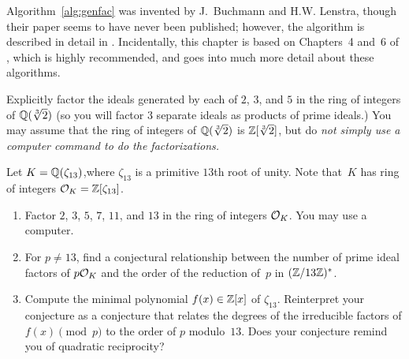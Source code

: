 Algorithm~\ref{alg:genfac} was invented by J.~Buchmann and
H.\thinspace{}W. Lenstra, though their paper seems to have never been
published; however, the algorithm is described in detail in
\cite[\S6.2.5]{cohen:course_ant}.  Incidentally, this chapter is based
on Chapters~4 and~6 of \cite{cohen:course_ant}, which is highly
recommended, and goes into much more detail about these algorithms.


\begin{exercise}
	Explicitly factor the ideals generated by each of $2$, $3$, and $5$ in
	the ring of integers of $\mathbb{Q}(\sqrt[3]{2})$ (so you will factor $3$
	separate ideals as products of prime ideals.)
	You may assume that the ring of integers of $\mathbb{Q}(\sqrt[3]{2})$
	is $\mathbb{Z}[\sqrt[3]{2}]$, but do \em{not} simply use a computer command to do
	the factorizations.
\end{exercise}

\begin{exercise}
	Let $K=\mathbb{Q}(\zeta_{13})$,where $\zeta_{13}$ is a primitive $13$th root of
	unity. Note that~$K$ has ring of integers $\mathcal{O}_K=\mathbb{Z}[\zeta_{13}]$.
	\begin{enumerate}
		\item Factor $2$, $3$, $5$, $7$, $11$, and $13$ in the ring
		of integers $\mathcal{O}_K$.  You may use a computer.
		\item For $p\neq 13$, find a conjectural
		relationship between the number of prime ideal factors of $p\mathcal{O}_K$
		and the order of the reduction of~$p$  in $(\mathbb{Z}/13\mathbb{Z})^*$.
		\item Compute the minimal polynomial $f(x)\in\mathbb{Z}[x]$ of $\zeta_{13}$.
		Reinterpret your conjecture as a conjecture that
		relates the degrees of the irreducible factors of $f(x)\pmod{p}$ to
		the order of $p$ modulo~$13$. Does your conjecture
		remind you of quadratic reciprocity?
	\end{enumerate}
\end{exercise}




